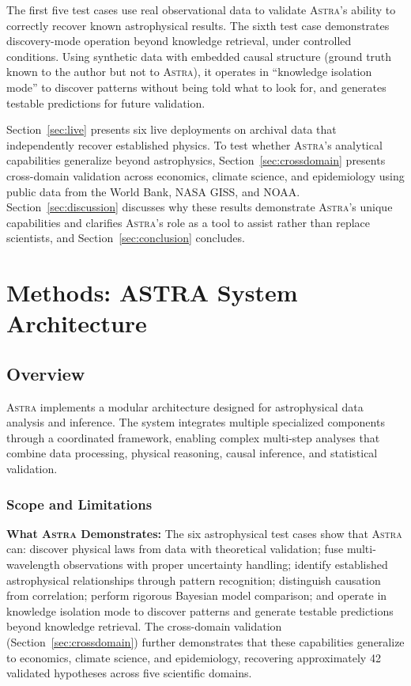 \documentclass[usenatbib]{rasti}
\newcommand{\astra}{\textsc{Astra}\xspace}
\begin{document}
The first five test cases use real observational data to validate \astra's ability to correctly recover known astrophysical results.
The sixth test case demonstrates discovery-mode operation beyond knowledge retrieval, under controlled conditions.
Using synthetic data with embedded causal structure (ground truth known to the author but not to \astra), it operates in ``knowledge isolation mode'' to discover patterns without being told what to look for, and generates testable predictions for future validation.

Section~\ref{sec:live} presents six live deployments on archival data that independently recover established physics.
To test whether \astra's analytical capabilities generalize beyond astrophysics, Section~\ref{sec:crossdomain} presents cross-domain validation across economics, climate science, and epidemiology using public data from the World Bank, NASA GISS, and NOAA.
Section~\ref{sec:discussion} discusses why these results demonstrate \astra's unique capabilities and clarifies \astra's role as a tool to assist rather than replace scientists, and Section~\ref{sec:conclusion} concludes.

\section{Methods: ASTRA System Architecture}
\label{sec:methods}

\subsection{Overview}
\label{sec:methods:overview}

\astra implements a modular architecture designed for astrophysical data analysis and inference.
The system integrates multiple specialized components through a coordinated framework, enabling complex multi-step analyses that combine data processing, physical reasoning, causal inference, and statistical validation.

\subsubsection{Scope and Limitations}
\label{sec:scope}

\textbf{What \astra Demonstrates:}
The six astrophysical test cases show that \astra can: discover physical laws from data with theoretical validation; fuse multi-wavelength observations with proper uncertainty handling; identify established astrophysical relationships through pattern recognition; distinguish causation from correlation; perform rigorous Bayesian model comparison; and operate in knowledge isolation mode to discover patterns and generate testable predictions beyond knowledge retrieval.
The cross-domain validation (Section~\ref{sec:crossdomain}) further demonstrates that these capabilities generalize to economics, climate science, and epidemiology, recovering approximately 42 validated hypotheses across five scientific domains.
\end{document}
